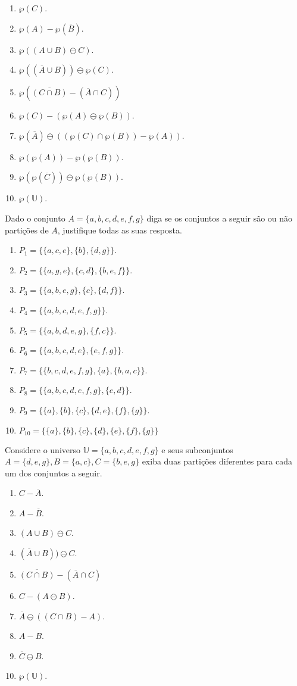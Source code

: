 \begin{problemset}
	\begin{enumerate}
		\item $\wp(C)$.
		\item $\wp(A) - \wp(\overline{B})$.
		\item $\wp((A \cup B) \ominus C)$.
		\item $\wp((\overline{A} \cup B)) \ominus \wp(C)$.
		\item $\wp(\overline{(C \cap B)} - (\overline{A} \cap C))$
		\item $\wp(C) - (\wp(A) \ominus \wp(B))$.
		\item $\wp(\overline{A}) \ominus ((\wp(C) \cap \wp(B))  -  \wp(A))$.
		\item $\wp(\wp(A)) - \wp(\wp(B))$.
		\item $\wp(\wp(\overline{C})) \ominus \wp(\wp(B))$.
		\item $\wp(\mathbb{U})$.
	\end{enumerate}
	\item Dado o conjunto $A = \{a, b, c, d, e, f, g\}$ diga se os conjuntos a seguir são ou não partições de $A$, justifique todas as suas resposta.
	\begin{enumerate}
		\item $P_1 = \{\{a, c, e\}, \{b\}, \{d, g\}\}$.
		\item $P_2 = \{\{a, g, e\}, \{c, d\}, \{b, e, f\}\}$.
		\item $P_3 = \{\{a, b, e, g\}, \{c\}, \{d, f\}\}$.
		\item $P_4 = \{\{a, b, c, d, e, f, g\}\}$.
		\item $P_5 = \{\{a, b, d, e, g\}, \{f, c\}\}$.
		\item $P_6 = \{\{a, b, c, d, e\}, \{e, f, g\}\}$.
		\item $P_7 = \{\{b, c, d, e, f, g\}, \{a\}, \{b, a,c\}\}$.
		\item $P_8 = \{\{a, b, c, d, e, f, g\}, \{e, d\}\}$.
		\item $P_9 = \{\{a\}, \{b\}, \{c\}, \{d,e\}, \{f\}, \{g\}\}$.
		\item $P_{10} = \{\{a\}, \{b\}, \{c\}, \{d\}, \{e\}, \{f\}, \{g\}\}$
	\end{enumerate}
	\item Considere o universo $\mathbb{U} = \{a, b, c, d, e, f, g\}$ e seus subconjuntos $A = \{d, e, g\}, B = \{a, c\}, C =\{b, e, g\}$ exiba duas partições diferentes para cada um dos conjuntos a seguir. 
	\begin{enumerate}
		\item $C - \overline{A}$.
		\item $A - \overline{B}$.
		\item $(A \cup B) \ominus C$.
		\item $(\overline{A} \cup B)) \ominus C$.
		\item $\overline{(C \cap B)} - (\overline{A} \cap C)$
		\item $C - (A \ominus B)$.
		\item $\overline{A} \ominus ((C \cap B)  - A)$.
		\item $A - B$.
		\item $\overline{C} \ominus B$.
		\item $\wp(\mathbb{U})$.
	\end{enumerate}
\end{problemset}